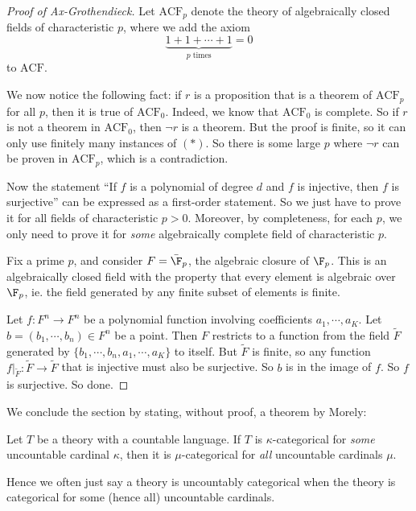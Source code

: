 \documentclass[a4paper]{article}
\begin{document}
\begin{own}
\begin{proof}[Proof of Ax-Grothendieck]
    Let $\mathrm{ACF}_p$ denote the theory of algebraically closed fields of characteristic $p$, where we add the axiom
    \[
      \underbrace{1 + 1 + \cdots + 1}_{p\text{ times}} = 0
    \]
    to $\mathrm{ACF}$.

    We now notice the following fact: if $r$ is a proposition that is a theorem of $\mathrm{ACF}_p$ for all $p$, then it is true of $\mathrm{ACF}_0$. Indeed, we know that $\mathrm{ACF}_0$ is complete. So if $r$ is not a theorem in $\mathrm{ACF}_0$, then $\neg r$ is a theorem. But the proof is finite, so it can only use finitely many instances of $(*)$. So there is some large $p$ where $\neg r$ can be proven in $\mathrm{ACF}_p$, which is a contradiction.

    Now the statement ``If $f$ is a polynomial of degree $d$ and $f$ is injective, then $f$ is surjective'' can be expressed as a first-order statement. So we just have to prove it for all fields of characteristic $p > 0$. Moreover, by completeness, for each $p$, we only need to prove it for \emph{some} algebraically complete field of characteristic $p$.

    Fix a prime $p$, and consider $F = \bar{\F}_p$, the algebraic closure of $\F_p$. This is an algebraically closed field with the property that every element is algebraic over $\F_p$, ie. the field generated by any finite subset of elements is finite.

    Let $f: F^n \to F^n$ be a polynomial function involving coefficients $a_1, \cdots, a_K$. Let $b = (b_1, \cdots, b_n) \in F^n$ be a point. Then $F$ restricts to a function from the field $\tilde{F}$ generated by $\{b_1, \cdots, b_n, a_1, \cdots, a_K\}$ to itself. But $\tilde{F}$ is finite, so any function $f|_{\tilde{F}}: \tilde{F} \to \tilde{F}$ that is injective must also be surjective. So $b$ is in the image of $f$. So $f$ is surjective. So done.
  \end{proof}

  We conclude the section by stating, without proof, a theorem by Morely:
  \begin{thm}
    Let $T$ be a theory with a countable language. If $T$ is $\kappa$-categorical for \emph{some} uncountable cardinal $\kappa$, then it is $\mu$-categorical for \emph{all} uncountable cardinals $\mu$.
  \end{thm}
  Hence we often just say a theory is uncountably categorical when the theory is categorical for some (hence all) uncountable cardinals.
\end{own}
\end{document}
